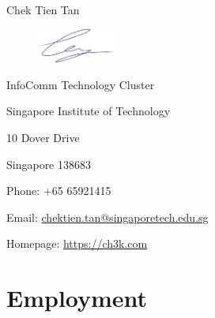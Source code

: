 \documentclass[10pt,a4paper]{article}
\def\name{Chek Tien Tan}
\begin{document}
{\huge \name}

\begin{figure}[h!]
    \includegraphics[width=1in]{signature}
\end{figure}


\begin{minipage}[t]{0.5\textwidth}
    InfoComm Technology Cluster

    Singapore Institute of Technology

    10 Dover Drive

    Singapore 138683
\end{minipage}

\begin{minipage}[t]{0.5\textwidth}
  Phone: +65 65921415

  Email: \href{mailto:chektien.tan@singaporetech.edu.sg}{chektien.tan@singaporetech.edu.sg}

  Homepage: \href{http://ch3k.com}{https://ch3k.com}
\end{minipage}


\section*{Employment}
\end{document}
